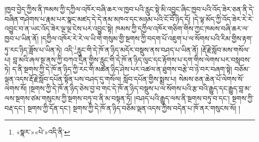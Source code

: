 །ཁྱབ་བྱེད་ཀྱིས་ནི་ཁམས་ཀྱི་དཀྱིལ་འཁོར་བཞི་ཆར་ལ་ཁྱབ་པའི་རླུང་སྟེ་མི་འབྱུང་ཞིང་ཁྱབ་པའི་འོད་ཟེར་ཅན་ནི་དེ་བཞིན་གཤེགས་པ་རྣམ་པར་སྣང་མཛད་དེ་དེ་ནམ་མཁའ་དང་མཉམ་པའི་ངོ་བོ་ཉིད་དོ། །དེ་ལྟ་མོད་ཀྱི་འོད་ཟེར་རེ་རེ་འབྱུང་བ་ན་ཡང་འོད་ཟེར་ལྔ་ལྔ་ངེས་པར་འབྱུང་སྟེ། ཁམས་ཀྱི་དཀྱིལ་འཁོར་གཅིག་གིས་ཀྱང་ཁམས་བཞི་ཆར་ལ་ཁྱབ་པ་ཡིན་ནོ། །དཀྱིལ་འཁོར་རེ་རེ་ལ་ཡི་གེ་གསུམ་གྱི་སྔགས་ཀྱི་བདག་པོ་འཇུག་པ་ལ་སོགས་པའི་རིམ་གྱིས་རྟག་ཏུ་རང་ཉིད་ཟློས་པ་ཡིན་ཏེ། འདི་\footnote{«སྣར་»«པེ་»འདི་ནི་}རླུང་གི་དེ་ཁོ་ན་ཉིད་མདོར་བསྡུས་ནས་བཤད་པ་ཡིན་ནོ། །རྡོ་རྗེ་སློབ་མས་གསོལ་པ། བླ་མའི་ཞལ་སྔ་ནས་ཀྱི་བཀའ་དྲིན་གྱིས་རླུང་གི་དེ་ཁོ་ན་ཉིད་ལུང་དང་རྟོགས་པ་དག་གིས་ལེགས་པར་བསླབས་ཏེ། ད་ནི་སྔགས་ཀྱི་དེ་ཁོ་ན་ཉིད་ཀྱི་རང་གི་མཚན་ཉིད་ཤེས་པར་འཚལ་ན་ཐུགས་བརྩེ་བ་ཉེ་བར་བཞག་སྟེ། བཅོམ་ལྡན་འདས་རྡོ་རྗེ་སློབ་དཔོན་སྟོན་པས་བཤད་དུ་གསོལ། སློབ་དཔོན་གྱིས་སྨྲས་པ། སེམས་ཅན་ཆེན་པོ་ལེགས་སོ་ལེགས་སོ། །སྔགས་ཀྱི་དེ་ཁོ་ན་ཉིད་ཅེས་བྱ་བ་གང་དེ་ཁོ་ན་ཉིད་བསྡུས་པ་ལ་སོགས་པའི་རྩ་བའི་རྒྱུད་དང་རྒྱུད་བླ་མ་ལས་སྔགས་ཙམ་གསུངས་ཀྱི་སྔགས་བཏུ་བ་ནི་མ་བསྟན་ཏོ། །བཤད་པའི་རྒྱུད་ལས་ནི་སྔགས་བཏུ་བ་དང་། སྔགས་ཀྱི་བརྡ་དང་། སྔགས་ཀྱི་དོན་དང་། སྔགས་ཀྱི་དེ་ཁོ་ན་ཉིད་བཅོམ་ལྡན་འདས་ཀྱིས་བདེན་པ་ཁོ་ནར་གསུངས་སོ། །
